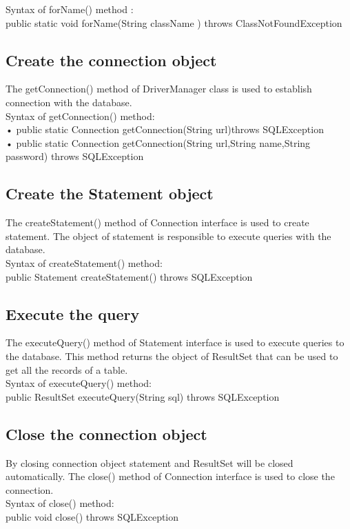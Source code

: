Syntax of forName() method :\\
public static void forName(String className ) throws ClassNotFoundException\\

\subsection{Create the connection object}
The getConnection() method of DriverManager class is used to establish connection with the database.\\

\noindent Syntax of getConnection() method:\\
• public static Connection getConnection(String url)throws SQLException\\
• public static Connection getConnection(String url,String name,String password) throws SQLException
\subsection{Create the Statement object}
The createStatement() method of Connection interface is used to create statement. The object of statement is responsible to execute queries with the database.\\

\noindent Syntax of createStatement() method:\\
public Statement createStatement() throws SQLException
\subsection{Execute the query}
The executeQuery() method of Statement interface is used to execute queries to the database. This method returns the object of ResultSet that can be used to get all the records of a table.\\

\noindent Syntax of executeQuery() method:\\
public ResultSet executeQuery(String sql) throws SQLException
\subsection{Close the connection object}
By closing connection object statement and ResultSet will be closed automatically. The close() method of Connection interface is used to close the connection.\\

\noindent Syntax of close() method:\\
public void close() throws SQLException

\thispagestyle{fancy}
